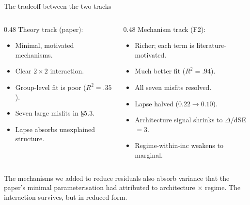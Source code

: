 \documentclass[10pt,aspectratio=169]{beamer}
\begin{document}
\begin{frame}{The tradeoff between the two tracks}
\begin{columns}[t]
\begin{column}{0.48\textwidth}
Theory track (paper):
\begin{itemize}\itemsep0.2em
  \item Minimal, motivated mechanisms.
  \item Clear $2\!\times\!2$ interaction.
  \item Group-level fit is poor ($R^2 = .35$).
  \item Seven large misfits in \S5.3.
  \item Lapse absorbs unexplained structure.
\end{itemize}
\end{column}

\begin{column}{0.48\textwidth}
Mechanism track (F2):
\begin{itemize}\itemsep0.2em
  \item Richer; each term is literature-motivated.
  \item Much better fit ($R^2 = .94$).
  \item All seven misfits resolved.
  \item Lapse halved ($0.22 \to 0.10$).
  \item Architecture signal shrinks to $\Delta/$dSE $= 3$.
  \item Regime-within-inc weakens to marginal.
\end{itemize}
\end{column}
\end{columns}

\vspace{1em}
The mechanisms we added to reduce residuals also absorb variance that the paper's minimal parameterisation had attributed to architecture $\times$ regime. The interaction survives, but in reduced form.
\end{frame}
\end{document}
